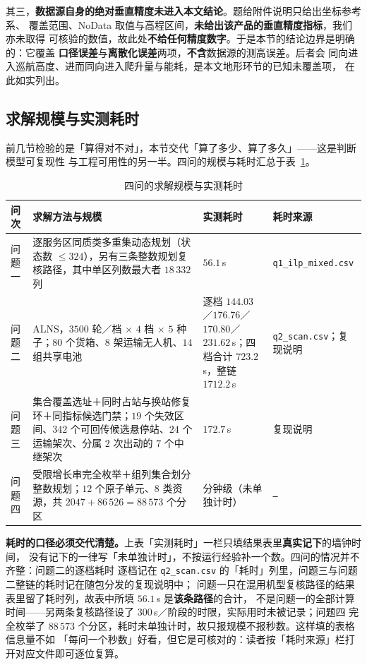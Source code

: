 其三，\textbf{数据源自身的绝对垂直精度未进入本文结论}。题给附件说明只给出坐标参考系、
覆盖范围、NoData 取值与高程区间，\textbf{未给出该产品的垂直精度指标}，我们亦未取得
可核验的数值，故此处\textbf{不给任何精度数字}。于是本节的结论边界是明确的：它覆盖
\textbf{口径误差}与\textbf{离散化误差}两项，\textbf{不含}数据源的测高误差。后者会
同向进入巡航高度、进而同向进入爬升量与能耗，是本文地形环节的已知未覆盖项，
在此如实列出。

\subsection{求解规模与实测耗时}
\label{sec:solve-scale}

前几节检验的是「算得对不对」，本节交代「算了多少、算了多久」——这是判断模型可复现性
与工程可用性的另一半。四问的规模与耗时汇总于表~\ref{tab:solve-scale}。

\begin{table}[htbp]
	\caption{四问的求解规模与实测耗时}
	\label{tab:solve-scale}
	\centering
	\small
	\begin{tabularx}{\textwidth}{@{}>{\hsize=0.50\hsize}X >{\hsize=1.60\hsize}X >{\hsize=1.05\hsize}X >{\hsize=0.85\hsize}X@{}}
		\toprule
		问次 & 求解方法与规模 & 实测耗时 & 耗时来源 \\
		\midrule
		问题一 & 逐服务区同质类多重集动态规划（状态数 $\le 324$），另有三条整数规划复核路径，其中单区列数最大者 $18\,332$ 列 & $56.1$\,s & \texttt{q1\_ilp\_\allowbreak mixed.csv} \\
		问题二 & ALNS，$3500$ 轮／档 $\times$ $4$ 档 $\times$ $5$ 种子；$80$ 个货箱、$8$ 架运输无人机、$14$ 组共享电池 & 逐档 $144.03$／$176.76$／$170.80$／$231.62$\,s；四档合计 $723.2$\,s，整链 $1712.2$\,s & \texttt{q2\_scan.csv}；复现说明 \\
		问题三 & 集合覆盖选址＋同时占站与换站修复环＋同指标候选门禁；$19$ 个失效区间、$342$ 个可回传候选悬停站、$24$ 个运输架次、分属 $2$ 次出动的 $7$ 个中继架次 & $172.7$\,s & 复现说明 \\
		问题四 & 受限增长串完全枚举＋组列集合划分整数规划；$12$ 个原子单元、$8$ 类资源，共 $2047+86\,526=88\,573$ 个分区 & 分钟级（未单独计时） & \texttt{---} \\
		\bottomrule
	\end{tabularx}
\end{table}

\textbf{耗时的口径必须交代清楚。}上表「实测耗时」一栏只填结果表里\textbf{真实记下}的墙钟时间，
没有记下的一律写「未单独计时」，不按运行经验补一个数。四问的情况并不齐整：问题二的逐档耗时
逐档记在 \texttt{q2\_scan.csv} 的「耗时」列里，问题三与问题二整链的耗时记在随包分发的复现说明中；
问题一只在混用机型复核路径的结果表里留了耗时列，故表中所填 $56.1$\,s 是\textbf{该条路径}的合计，
不是问题一的全部计算时间——另两条复核路径设了 $300$\,s／阶段的时限，实际用时未被记录；问题四
完全枚举了 $88\,573$ 个分区，耗时未单独计时，故只报规模不报秒数。这样填的表格信息量不如
「每问一个秒数」好看，但它是可核对的：读者按「耗时来源」栏打开对应文件即可逐位复算。

